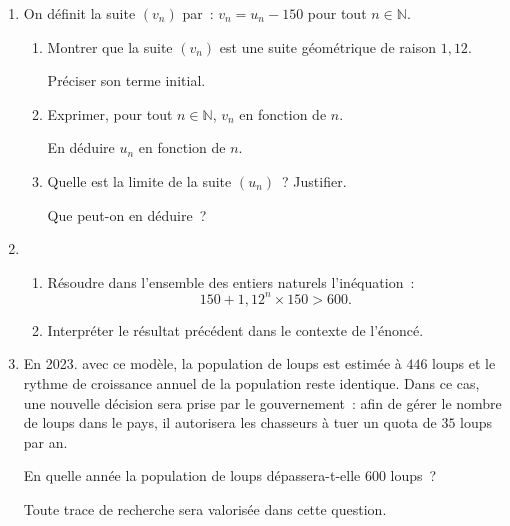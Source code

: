 \begin{enumerate}
\begin{center}
             \end{center}
               \item On définit la suite $\left(v_n\right)$ par~: $v_n = u_n - 150$ pour tout $n \in \mathbb{N}$.
               \begin{enumerate}[label=\alph*.]
                    \item Montrer que la suite $\left(v_n\right)$ est une suite géométrique de raison $1,12$.
                    \par
                    Préciser son terme initial.
                    \item Exprimer, pour tout $n \in \mathbb{N}$,  $v_n$ en fonction de $n$.
                    \par
                    En déduire $u_n$ en fonction de $n$.
                    \item Quelle est la limite de la suite $\left(u_n\right)$~? Justifier.
                    \par
                    Que peut-on en déduire~?
               \end{enumerate}
               \item
               \begin{enumerate}[label=\alph*.]
                    \item Résoudre dans l'ensemble des entiers naturels l'inéquation~:
                    \[150 + 1,12^n \times 150 > 600.\]
                    \item Interpréter le résultat précédent dans le contexte de l'énoncé.
               \end{enumerate}
               \item En 2023. avec ce modèle, la population de loups est estimée à $446$ loups et le rythme de croissance annuel de la population reste identique. Dans ce cas, une nouvelle
               décision sera prise par le gouvernement~: afin de gérer le nombre de loups dans le
               pays, il autorisera les chasseurs à tuer un quota de $35$ loups par an.
               \par
               En quelle année la population de loups dépassera-t-elle $600$ loups~?
               \par
               Toute trace de recherche sera valorisée dans cette question.
          \end{enumerate}

